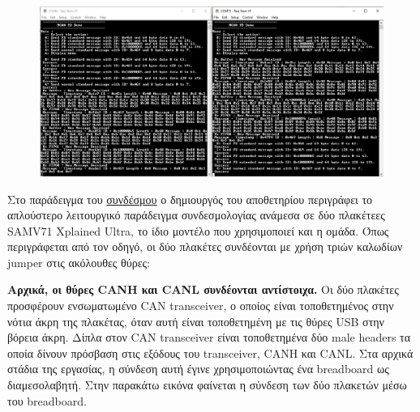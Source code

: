 \documentclass[a4paper,nobib,justified]{tufte-book}
\begin{document}
\begin{figure}[h]
	\includegraphics{media/images/microchip-example-menu.png}
\end{figure}

\par Στο παράδειγμα του \href{https://github.com/Microchip-MPLAB-Harmony/csp_apps_sam_e70_s70_v70_v71/tree/master/apps/mcan/mcan_fd_operation_interrupt_timestamp}{συνδέσμου} ο δημιουργός του αποθετηρίου περιγράφει το απλούστερο λειτουργικό παράδειγμα συνδεσμολογίας ανάμεσα σε δύο πλακέτεες SAMV71 Xplained Ultra, το ίδιο μοντέλο που χρησιμοποιεί και η ομάδα. Όπως περιγράφεται από τον οδηγό, οι δύο πλακέτες συνδέονται με χρήση τριών καλωδίων jumper στις ακόλουθες θύρες:

\par \textbf{Αρχικά, οι θύρες CANH και CANL συνδέονται αντίστοιχα.} Οι δύο πλακέτες προσφέρουν ενσωματωμένο CAN transceiver, ο οποίος είναι τοποθετημένος στην νότια άκρη της πλακέτας, όταν αυτή είναι τοποθετημένη με τις θύρες USB στην βόρεια άκρη. Δίπλα στον CAN transceiver είναι τοποθετημένα δύο male headers τα οποία δίνουν πρόσβαση στις εξόδους του transceiver, CANH και CANL. Στα αρχικά στάδια της εργασίας, η σύνδεση αυτή έγινε χρησιμοποιώντας ένα breadboard ως διαμεσολαβητή. Στην παρακάτω εικόνα φαίνεται η σύνδεση των δύο πλακετών μέσω του breadboard.
\end{document}
